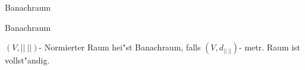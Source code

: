 \documentclass[class=article, crop=false]{standalone}
\begin{document}
\begin{zettel}{Banachraum}
\begin{flashcard}[ut40njya]{Banachraum}
	\begin{definition}[Banachraum]
		$ (V, ||\ ||)  $- Normierter Raum hei"st Banachraum, falls $ (V,d_{||\ ||}) $- metr. Raum ist vollst"andig.
	\end{definition}
\end{flashcard}
\end{zettel}
\end{document}
